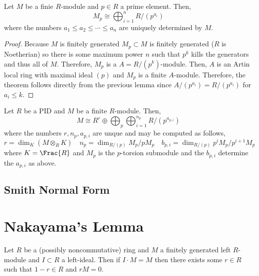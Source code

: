\documentclass[12pt]{article}
\begin{document}
\begin{prop}
Let $M$ be a finie $R$-module and $p \in R$ a prime element. Then,
\[ M_p \cong \bigoplus_{i = 1}^n R / (p^{a_i}) \]
where the numbers $a_1 \le a_2 \le \cdots \le a_n$ are uniquely determined by $M$. 
\end{prop}


\begin{proof}
Because $M$ is finitely generated $M_p \subset M$ is finitely generated ($R$ is Noetherian) so there is some maximum power $n$ such that $p^k$ kills the generators and thus all of $M$. Therefore, $M_p$ is a $A = R/(p^k)$-module. Then, $A$ is an Artin local ring with maximal ideal $(p)$ and $M_p$ is a finite $A$-module. Therefore, the theorem follows directly from the previous lemma since $A / (p^{a_i}) = R / (p^{a_i})$ for $a_i \le k$.
\end{proof}

\begin{theorem}
Let $R$ be a PID and $M$ be a finite $R$-module. Then,
\[ M \cong R^r \oplus \bigoplus_{p} \bigoplus_{i = 1}^{n_p} R / (p^{a_{p,i}}) \]
where the numbers $r, n_p, a_{p,i}$ are unque and may be computed as follows,
\[ r = \dim_K (M \otimes_R K) \quad n_p = \dim_{R/(p)} M_p/p M_p \quad b_{p,i} = \dim_{R/(p)} p^i M_p / p^{i+1} M_p \]
where $K = \Frac{R}$ and $M_p$ is the $p$-torsion submodule and the $b_{p,i}$ determine the $a_{p,i}$ as above.
\end{theorem}


\subsection{Smith Normal Form}

\begin{prop}

\end{prop}




\section{Nakayama's Lemma}

\begin{prop}
Let $R$ be a (possibly noncommutative) ring and $M$ a finitely generated left $R$-module and $I \subset R$ a left-ideal. Then if $I \cdot M = M$ then there exists some $r \in R$ such that $1 - r \in R$ and $r M = 0$.
\end{prop}
\end{document}
